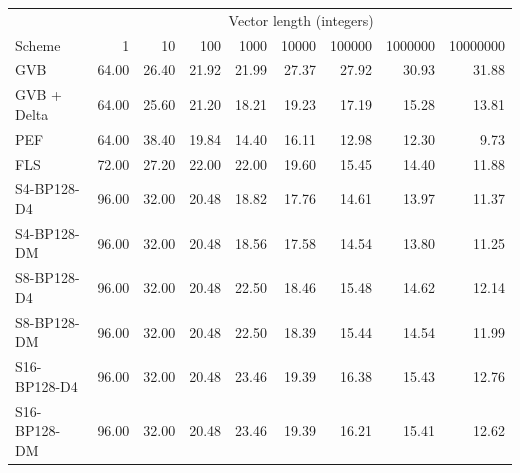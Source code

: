 \begin{tabular}{lrrrrrrrr}
\toprule
 & \multicolumn{8}{c}{Vector length (integers)} \\
Scheme & 1 & 10 & 100 & 1000 & 10000 & 100000 & 1000000 & 10000000 \\
\midrule
GVB & 64.00 & 26.40 & 21.92 & 21.99 & 27.37 & 27.92 & 30.93 & 31.88 \\
GVB + Delta & 64.00 & 25.60 & 21.20 & 18.21 & 19.23 & 17.19 & 15.28 & 13.81 \\
PEF & 64.00 & 38.40 & 19.84 & 14.40 & 16.11 & 12.98 & 12.30 & 9.73 \\
FLS & 72.00 & 27.20 & 22.00 & 22.00 & 19.60 & 15.45 & 14.40 & 11.88 \\
S4-BP128-D4 & 96.00 & 32.00 & 20.48 & 18.82 & 17.76 & 14.61 & 13.97 & 11.37 \\
S4-BP128-DM & 96.00 & 32.00 & 20.48 & 18.56 & 17.58 & 14.54 & 13.80 & 11.25 \\
S8-BP128-D4 & 96.00 & 32.00 & 20.48 & 22.50 & 18.46 & 15.48 & 14.62 & 12.14 \\
S8-BP128-DM & 96.00 & 32.00 & 20.48 & 22.50 & 18.39 & 15.44 & 14.54 & 11.99 \\
S16-BP128-D4 & 96.00 & 32.00 & 20.48 & 23.46 & 19.39 & 16.38 & 15.43 & 12.76 \\
S16-BP128-DM & 96.00 & 32.00 & 20.48 & 23.46 & 19.39 & 16.21 & 15.41 & 12.62 \\
\bottomrule
\end{tabular}
